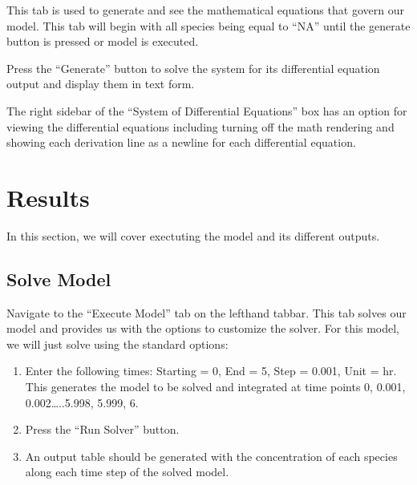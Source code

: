 \documentclass[letterpaper,10pt,english]{sphinxmanual}
\begin{document}
\sphinxAtStartPar
This tab is used to generate and see the mathematical equations that govern
our model.  This tab will begin with all species being equal to “NA” until the
generate button is pressed or model is executed.

\sphinxAtStartPar
Press the “Generate” button to solve the system for its differential equation
output and display them in text form.

\begin{figure}[htbp]
\centering

\noindent{}
\end{figure}

\sphinxAtStartPar
{} The right sidebar of the “System of Differential Equations” box has an
option for viewing the differential equations including turning off the math
rendering and showing each derivation line as a newline for each differential
equation.


\section{Results}
\label{\detokenize{pages/tutorial_mc/2_model_results:results}}\label{\detokenize{pages/tutorial_mc/2_model_results::doc}}
\sphinxAtStartPar
In this section, we will cover exectuting the model and its different outputs.


\subsection{Solve Model}
\label{\detokenize{pages/tutorial_mc/2_model_results:solve-model}}
\sphinxAtStartPar
Navigate to the “Execute Model” tab on the lefthand tabbar. This tab solves our
model and provides us with the options to customize the solver. For this model,
we will just solve using the standard options:
\begin{enumerate}
%
\item {} 
\sphinxAtStartPar
Enter the following times: Starting = 0, End = 5, Step = 0.001, Unit = hr.
This generates the model to be solved and integrated at time points 0, 0.001,
0.002…..5.998, 5.999, 6.

\item {} 
\sphinxAtStartPar
Press the “Run Solver” button.

\item {} 
\sphinxAtStartPar
An output table should be generated with the concentration of each species
along each time step of the solved model.

\end{enumerate}
\end{document}

